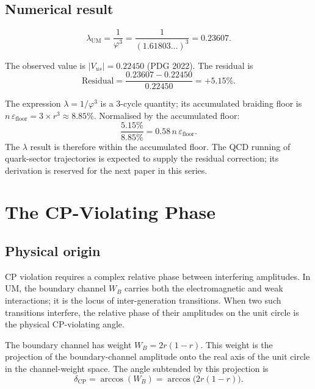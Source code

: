 \documentclass[12pt]{article}
\begin{document}
\subsection{Numerical result}

\begin{equation}
  \lambda_{\text{UM}} = \frac{1}{\varphi^3}
  = \frac{1}{(1.61803\ldots)^3}
  = 0.23607.
  \label{eq:lambda_num}
\end{equation}

The observed value is $|V_{us}| = 0.22450$ (PDG 2022). The residual is
\begin{equation}
  \text{Residual} = \frac{0.23607 - 0.22450}{0.22450}
  = +5.15\%.
  \label{eq:lambda_res}
\end{equation}

The expression $\lambda = 1/\varphi^3$ is a 3-cycle quantity; its accumulated
braiding floor is $n\,\varepsilon_{\text{floor}} = 3 \times r^3 \approx 8.85\%$.
Normalised by the accumulated floor:
\[
  \frac{5.15\%}{8.85\%} = 0.58\,n\,\varepsilon_{\text{floor}}.
\]
The $\lambda$ result is therefore within the accumulated floor. The
QCD running of quark-sector trajectories is expected to supply the residual
correction; its derivation is reserved for the next paper in this series.

\section{The CP-Violating Phase}

\subsection{Physical origin}

CP violation requires a complex relative phase between interfering
amplitudes. In UM, the boundary channel $W_B$ carries both the
electromagnetic and weak interactions; it is the locus of inter-generation
transitions. When two such transitions interfere, the relative phase of
their amplitudes on the unit circle is the physical CP-violating angle.

The boundary channel has weight $W_B = 2r(1-r)$. This weight is the
projection of the boundary-channel amplitude onto the real axis of the
unit circle in the channel-weight space. The angle subtended by this
projection is
\begin{equation}
  \delta_{\text{CP}} = \arccos(W_B) = \arccos\!\bigl(2r(1-r)\bigr).
  \label{eq:delta}
\end{equation}
\end{document}
